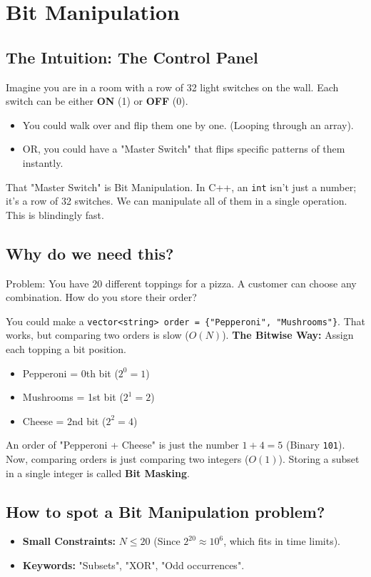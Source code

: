 \documentclass[12pt, a4paper]{report}
\begin{document}
\chapter{Bit Manipulation}
\section{The Intuition: The Control Panel}
Imagine you are in a room with a row of 32 light switches on the wall. Each switch can be either \textbf{ON} (1) or \textbf{OFF} (0).
\begin{itemize}
    \item You could walk over and flip them one by one. (Looping through an array).
    \item OR, you could have a "Master Switch" that flips specific patterns of them instantly.
\end{itemize}

That "Master Switch" is Bit Manipulation. In C++, an \texttt{int} isn't just a number; it's a row of 32 switches. We can manipulate all of them in a single operation. This is blindingly fast.

\section{Why do we need this?}
\begin{thinkbox}
Problem: You have 20 different toppings for a pizza. A customer can choose any combination. How do you store their order?
\end{thinkbox}
You could make a \texttt{vector<string> order = \{"Pepperoni", "Mushrooms"\}}. That works, but comparing two orders is slow ($O(N)$).
\textbf{The Bitwise Way:} Assign each topping a bit position.
\begin{itemize}
    \item Pepperoni = 0th bit ($2^0 = 1$)
    \item Mushrooms = 1st bit ($2^1 = 2$)
    \item Cheese = 2nd bit ($2^2 = 4$)
\end{itemize}
An order of "Pepperoni + Cheese" is just the number $1 + 4 = 5$ (Binary \texttt{101}).
Now, comparing orders is just comparing two integers ($O(1)$). Storing a subset in a single integer is called \textbf{Bit Masking}.

\section{How to spot a Bit Manipulation problem?}
\begin{itemize}
    \item \textbf{Small Constraints:} $N \le 20$ (Since $2^{20} \approx 10^6$, which fits in time limits).
    \item \textbf{Keywords:} "Subsets", "XOR", "Odd occurrences".
\end{itemize}
\end{document}
